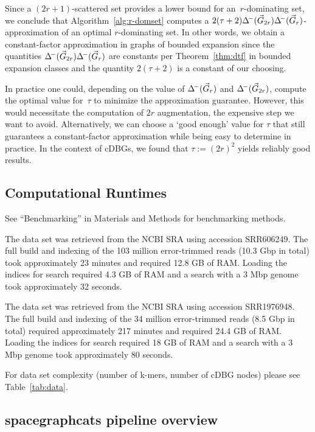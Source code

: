 \noindent
Since a $(2r+1)$-scattered set provides a lower bound for an~$r$-dominating
set, we conclude that Algorithm~\ref{alg:r-domset} computes a
$2(\tau+2)\Delta^{\!-}(\vec{G}_{2r})\Delta^{\!-}(\vec{G}_r)$-approximation of an
optimal $r$-dominating set. In other words, we obtain a constant-factor
approximation in graphs of bounded expansion since the quantities $\Delta^{\!-}(\vec{G}_{2r})\Delta^{\!-}(\vec{G}_r)$ are constants per Theorem~\ref{thm:dtf} in bounded
expansion classes and the quantity $2(\tau+2)$ is a constant of our choosing.

In practice one could, depending on the value of $\Delta^{\!-}(\vec{G}_r)$
and $\Delta^{\!-}(\vec{G}_{2r})$, compute the optimal value for~$\tau$ to minimize the 
approximation guarantee. However, this
would necessitate the computation of $2r$ augmentation, the expensive step we
want to avoid. Alternatively, we can choose a `good enough' value for $\tau$
that still guarantees a constant-factor approximation while being easy to
determine in practice. In the context of cDBGs, we found that
$\tau := (2r)^2$ yields reliably good results.

\subsection{Computational Runtimes}
\label{subsec:runtimes}

See ``Benchmarking'' in Materials and Methods for benchmarking methods.

The \podarv data set was retrieved from the NCBI SRA using accession
SRR606249.  The full build and indexing of the 103 million
error-trimmed reads (10.3 Gbp in total) took approximately 23 minutes
and required 12.8 GB of RAM. Loading the indices for search required
4.3 GB of RAM and a search with a 3 Mbp genome took approximately 32
seconds.

The \hu data set was retrieved from the NCBI SRA using accession
SRR1976948. The full build and indexing of the 34 million
error-trimmed reads (8.5 Gbp in total) required approximately 217
minutes and required 24.4 GB of RAM. Loading the indices for search
required 18 GB of RAM and a search with a 3 Mbp genome took
approximately 80 seconds.

For data set complexity (number of k-mers, number of cDBG nodes) please see
Table~\ref{tab:data}.

\subsection{spacegraphcats pipeline overview}
\label{subsec:sgc_pipeline}

